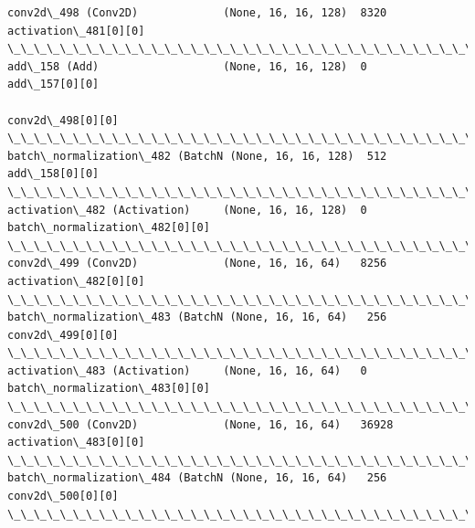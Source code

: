 \documentclass[11pt]{article}
\begin{document}
\begin{Verbatim}[commandchars=\\\{\}]
conv2d\_498 (Conv2D)             (None, 16, 16, 128)  8320        activation\_481[0][0]             
\_\_\_\_\_\_\_\_\_\_\_\_\_\_\_\_\_\_\_\_\_\_\_\_\_\_\_\_\_\_\_\_\_\_\_\_\_\_\_\_\_\_\_\_\_\_\_\_\_\_\_\_\_\_\_\_\_\_\_\_\_\_\_\_\_\_\_\_\_\_\_\_\_\_\_\_\_\_\_\_\_\_\_\_\_\_\_\_\_\_\_\_\_\_\_\_\_\_
add\_158 (Add)                   (None, 16, 16, 128)  0           add\_157[0][0]                    
                                                                 conv2d\_498[0][0]                 
\_\_\_\_\_\_\_\_\_\_\_\_\_\_\_\_\_\_\_\_\_\_\_\_\_\_\_\_\_\_\_\_\_\_\_\_\_\_\_\_\_\_\_\_\_\_\_\_\_\_\_\_\_\_\_\_\_\_\_\_\_\_\_\_\_\_\_\_\_\_\_\_\_\_\_\_\_\_\_\_\_\_\_\_\_\_\_\_\_\_\_\_\_\_\_\_\_\_
batch\_normalization\_482 (BatchN (None, 16, 16, 128)  512         add\_158[0][0]                    
\_\_\_\_\_\_\_\_\_\_\_\_\_\_\_\_\_\_\_\_\_\_\_\_\_\_\_\_\_\_\_\_\_\_\_\_\_\_\_\_\_\_\_\_\_\_\_\_\_\_\_\_\_\_\_\_\_\_\_\_\_\_\_\_\_\_\_\_\_\_\_\_\_\_\_\_\_\_\_\_\_\_\_\_\_\_\_\_\_\_\_\_\_\_\_\_\_\_
activation\_482 (Activation)     (None, 16, 16, 128)  0           batch\_normalization\_482[0][0]    
\_\_\_\_\_\_\_\_\_\_\_\_\_\_\_\_\_\_\_\_\_\_\_\_\_\_\_\_\_\_\_\_\_\_\_\_\_\_\_\_\_\_\_\_\_\_\_\_\_\_\_\_\_\_\_\_\_\_\_\_\_\_\_\_\_\_\_\_\_\_\_\_\_\_\_\_\_\_\_\_\_\_\_\_\_\_\_\_\_\_\_\_\_\_\_\_\_\_
conv2d\_499 (Conv2D)             (None, 16, 16, 64)   8256        activation\_482[0][0]             
\_\_\_\_\_\_\_\_\_\_\_\_\_\_\_\_\_\_\_\_\_\_\_\_\_\_\_\_\_\_\_\_\_\_\_\_\_\_\_\_\_\_\_\_\_\_\_\_\_\_\_\_\_\_\_\_\_\_\_\_\_\_\_\_\_\_\_\_\_\_\_\_\_\_\_\_\_\_\_\_\_\_\_\_\_\_\_\_\_\_\_\_\_\_\_\_\_\_
batch\_normalization\_483 (BatchN (None, 16, 16, 64)   256         conv2d\_499[0][0]                 
\_\_\_\_\_\_\_\_\_\_\_\_\_\_\_\_\_\_\_\_\_\_\_\_\_\_\_\_\_\_\_\_\_\_\_\_\_\_\_\_\_\_\_\_\_\_\_\_\_\_\_\_\_\_\_\_\_\_\_\_\_\_\_\_\_\_\_\_\_\_\_\_\_\_\_\_\_\_\_\_\_\_\_\_\_\_\_\_\_\_\_\_\_\_\_\_\_\_
activation\_483 (Activation)     (None, 16, 16, 64)   0           batch\_normalization\_483[0][0]    
\_\_\_\_\_\_\_\_\_\_\_\_\_\_\_\_\_\_\_\_\_\_\_\_\_\_\_\_\_\_\_\_\_\_\_\_\_\_\_\_\_\_\_\_\_\_\_\_\_\_\_\_\_\_\_\_\_\_\_\_\_\_\_\_\_\_\_\_\_\_\_\_\_\_\_\_\_\_\_\_\_\_\_\_\_\_\_\_\_\_\_\_\_\_\_\_\_\_
conv2d\_500 (Conv2D)             (None, 16, 16, 64)   36928       activation\_483[0][0]             
\_\_\_\_\_\_\_\_\_\_\_\_\_\_\_\_\_\_\_\_\_\_\_\_\_\_\_\_\_\_\_\_\_\_\_\_\_\_\_\_\_\_\_\_\_\_\_\_\_\_\_\_\_\_\_\_\_\_\_\_\_\_\_\_\_\_\_\_\_\_\_\_\_\_\_\_\_\_\_\_\_\_\_\_\_\_\_\_\_\_\_\_\_\_\_\_\_\_
batch\_normalization\_484 (BatchN (None, 16, 16, 64)   256         conv2d\_500[0][0]                 
\_\_\_\_\_\_\_\_\_\_\_\_\_\_\_\_\_\_\_\_\_\_\_\_\_\_\_\_\_\_\_\_\_\_\_\_\_\_\_\_\_\_\_\_\_\_\_\_\_\_\_\_\_\_\_\_\_\_\_\_\_\_\_\_\_\_\_\_\_\_\_\_\_\_\_\_\_\_\_\_\_\_\_\_\_\_\_\_\_\_\_\_\_\_\_\_\_\_

\end{Verbatim}
\end{document}
